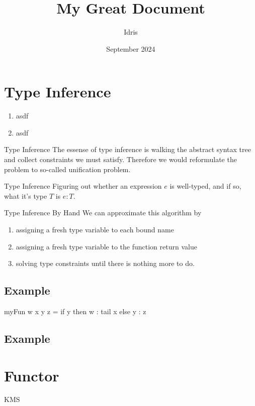 \documentclass[openany, 12pt]{book}
\title{My Great Document}
\author{Idris}
\date{September 2024}
\begin{document}
\maketitle{}
\tableofcontents

\listoffigures
\listoftables

\chapter{Type Inference}

\begin{enumerate}[label = {(\alph*)}]
	\item asdf
	\item asdf
\end{enumerate}

\begin{intuition}{Type Inference}
	The essense of type inference is walking the abstract syntax tree and
	collect constraints we must satisfy. Therefore we would reformulate the
	problem to so-called unification problem.
\end{intuition}

\begin{definition}{Type Inference}{}
	Figuring out whether an expression $e$ is well-typed, and if so, what it's
	type $T$ is $e: T$.
\end{definition}

\begin{definition}{Type Inference By Hand}{}
	We can approximate this algorithm by
	\begin{enumerate}
		\item assigning a fresh type variable to each bound name
		\item assigning a fresh type variable to the function return value
		\item solving type constraints until there is nothing more to do.
	\end{enumerate}
\end{definition}

\section{Example}
\begin{haskell}{}
	myFun w x y z = if y then w : tail x else y : z
\end{haskell}

\section{Example}

\chapter{Functor}
\gls{KMS}

\clearpage
\printglossaries

\printindex{}
\end{document}
